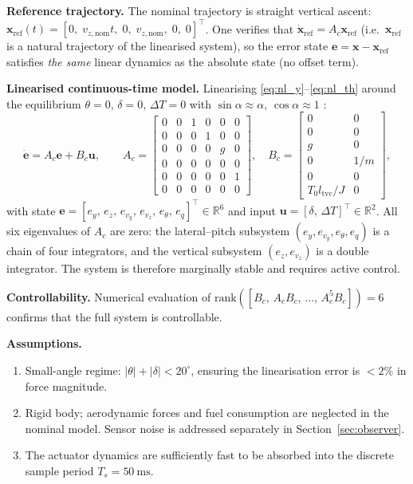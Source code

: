 \documentclass[11pt,a4paper]{article}
\newcommand{\vect}[1]{\bm{#1}}
\newcommand{\R}{\mathbb{R}}
\begin{document}
\textbf{Reference trajectory.}
The nominal trajectory is straight vertical ascent:
$\vect{x}_{\mathrm{ref}}(t) = [0,\; v_{z,\mathrm{nom}}t,\; 0,\; v_{z,\mathrm{nom}},\;
0,\; 0]^\top$.
One verifies that $\dot{\vect{x}}_{\mathrm{ref}} = A_c\vect{x}_{\mathrm{ref}}$
(i.e.\ $\vect{x}_{\mathrm{ref}}$ is a natural trajectory of the linearised system),
so the error state $\vect{e} = \vect{x} - \vect{x}_{\mathrm{ref}}$ satisfies
\emph{the same} linear dynamics as the absolute state (no offset term).

\textbf{Linearised continuous-time model.}
Linearising \eqref{eq:nl_y}--\eqref{eq:nl_th} around the equilibrium
$\theta=0$, $\delta=0$, $\Delta T=0$ with $\sin\alpha \approx \alpha$,
$\cos\alpha \approx 1$ \cite{Wie1998}:
\begin{equation}
  \dot{\vect{e}} = A_c\vect{e} + B_c\vect{u}, \qquad
  A_c = \begin{bmatrix}
    0 & 0 & 1 & 0 & 0 & 0 \\
    0 & 0 & 0 & 1 & 0 & 0 \\
    0 & 0 & 0 & 0 & g & 0 \\
    0 & 0 & 0 & 0 & 0 & 0 \\
    0 & 0 & 0 & 0 & 0 & 1 \\
    0 & 0 & 0 & 0 & 0 & 0
  \end{bmatrix}, \quad
  B_c = \begin{bmatrix}
    0 & 0 \\ 0 & 0 \\ g & 0 \\ 0 & 1/m \\ 0 & 0 \\ T_0 l_{\mathrm{tvc}}/J & 0
  \end{bmatrix},
  \label{eq:ct_model}
\end{equation}
with state $\vect{e} = [e_y,\, e_z,\, e_{v_y},\, e_{v_z},\, e_\theta,\, e_q]^\top
\in \R^6$ and input $\vect{u} = [\delta,\,\Delta T]^\top \in \R^2$.
All six eigenvalues of $A_c$ are zero: the lateral--pitch subsystem
$(e_y, e_{v_y}, e_\theta, e_q)$ is a chain of four integrators, and the vertical
subsystem $(e_z, e_{v_z})$ is a double integrator.
The system is therefore marginally stable and requires active control.

\textbf{Controllability.}
Numerical evaluation of $\mathrm{rank}([B_c,\,A_cB_c,\,\ldots,\,A_c^5B_c]) = 6$
confirms that the full system is controllable.

\textbf{Assumptions.}
\begin{enumerate}[noitemsep, label=A\arabic*.]
  \item Small-angle regime: $|\theta| + |\delta| < 20^{\circ}$, ensuring the linearisation
        error is $<2\%$ in force magnitude.
  \item Rigid body; aerodynamic forces and fuel consumption are neglected in the
        nominal model.  Sensor noise is addressed separately in
        Section~\ref{sec:observer}.
  \item The actuator dynamics are sufficiently fast to be absorbed into the discrete
        sample period $T_s = 50\ \mathrm{ms}$.
\end{enumerate}
\end{document}

